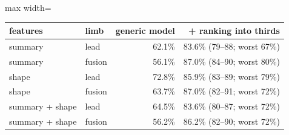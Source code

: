\begin{adjustbox}{max width=\textwidth}
{\footnotesize
\begin{tabular}{llrr}
\toprule
\textbf{features} & \textbf{limb} & \textbf{generic model} & \textbf{+ ranking into thirds} \\
\midrule
summary & lead & 62.1\% & 83.6\% (79--88; worst 67\%) \\
summary & fusion & 56.1\% & 87.0\% (84--90; worst 80\%) \\
shape & lead & 72.8\% & 85.9\% (83--89; worst 79\%) \\
shape & fusion & 63.7\% & 87.0\% (82--91; worst 72\%) \\
summary + shape & lead & 64.5\% & 83.6\% (80--87; worst 72\%) \\
summary + shape & fusion & 56.2\% & 86.2\% (82--90; worst 72\%) \\
\bottomrule
\end{tabular}
}
\end{adjustbox}
